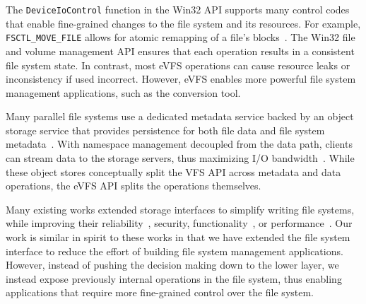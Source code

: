 The \texttt{DeviceIoControl} function in the Win32 API supports many control codes that enable fine-grained changes to the file system and its resources. For example, \texttt{FSCTL\_MOVE\_FILE} allows for atomic remapping of a file's blocks~\cite{win32-defrag}. The Win32 file and volume management API ensures that each operation results in a consistent file system state. In contrast, most eVFS operations can cause resource leaks or inconsistency if used incorrect. However, eVFS enables more powerful file system management applications, such as the conversion tool. 

Many parallel file systems use a dedicated metadata service backed by an object storage service that provides persistence for both file data and file system metadata~\cite{schwan2003lustre}. With namespace management decoupled from the data path, clients can stream data to the storage servers, thus maximizing I/O bandwidth~\cite{weil2006ceph}. While these object stores conceptually split the VFS API across metadata and data operations, the eVFS API splits the operations themselves.


Many existing works extended storage interfaces to simplify writing file systems, while improving their reliability~\cite{Sivathanu06}, security, functionality~\cite{shin2016isotope}, or performance~\cite{zhang2012nameless,anand08rangewrites}. Our work is similar in spirit to these works in that we have extended the file system interface to reduce the effort of building file system management applications. However, instead of pushing the decision making down to the lower layer, we instead expose previously internal operations in the file system, thus enabling applications that require more fine-grained control over the file system.

\vspace{-1ex}
